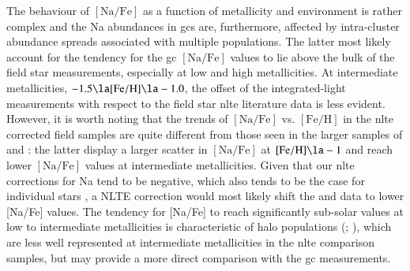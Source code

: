\documentclass{aa}
\begin{document}
The behaviour of $\mathrm{[Na/Fe]}$ as a function of metallicity and environment is rather complex and the Na abundances in \acp{gc} are, furthermore, affected by intra-cluster abundance spreads associated with multiple populations. The latter most likely account for the tendency for the \ac{gc} $\mathrm{[Na/Fe]}$ values to lie above the bulk of the field star measurements, especially at low and high metallicities. At intermediate metallicities, $-1.5 \la \mathrm{[Fe/H]} \la -1.0$, the offset of the integrated-light measurements with respect to the field star \ac{nlte} literature data is less evident. However, it is worth noting that the trends of $\mathrm{[Na/Fe]}$ vs. $\mathrm{[Fe/H]}$ in the \ac{nlte} corrected field samples are quite different from those seen in the larger samples of  and : the latter display a larger scatter in $\mathrm{[Na/Fe]}$ at $\mathrm{[Fe/H]}\la-1$ and reach lower $\mathrm{[Na/Fe]}$ values at intermediate metallicities. Given that our \ac{nlte} corrections for Na tend to be negative, which also tends to be the case for individual stars \citep{Gehren2004,Takeda2003}, a NLTE correction would most likely shift the  and  data to lower [Na/Fe] values. 
The tendency for [Na/Fe] to reach significantly sub-solar values at low to intermediate metallicities is characteristic of halo populations (; \citealt{Zhao2016}), which are less well represented at intermediate metallicities in the \ac{nlte} comparison samples, but may provide a more direct comparison with the \ac{gc} measurements.
\end{document}
